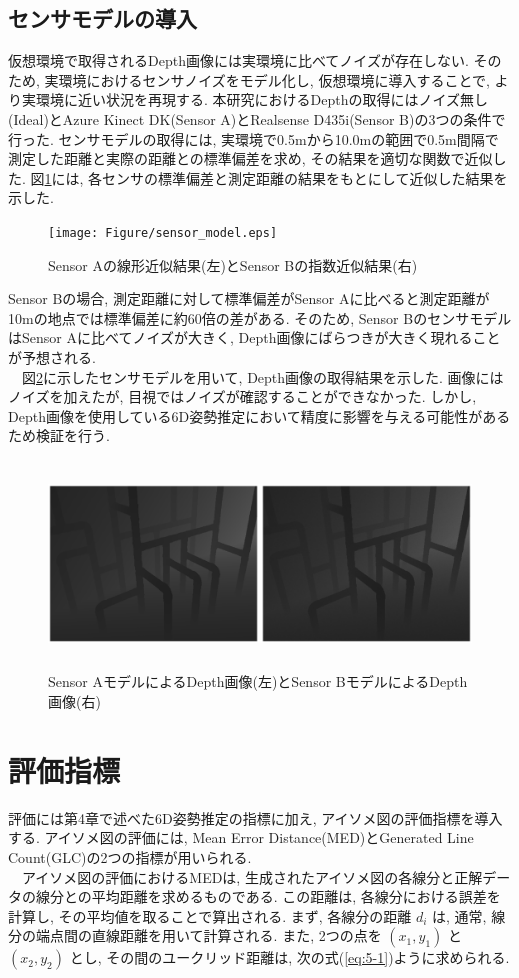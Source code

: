 \subsection{センサモデルの導入}
仮想環境で取得されるDepth画像には実環境に比べてノイズが存在しない. 
そのため, 実環境におけるセンサノイズをモデル化し, 仮想環境に導入することで, より実環境に近い状況を再現する. 
本研究におけるDepthの取得にはノイズ無し(Ideal)とAzure Kinect DK(Sensor A)とRealsense D435i(Sensor B)の3つの条件で行った. 
センサモデルの取得には, 実環境で0.5mから10.0mの範囲で0.5m間隔で測定した距離と実際の距離との標準偏差を求め, その結果を適切な関数で近似した. 
図\ref{fig:5-f2}には, 各センサの標準偏差と測定距離の結果をもとにして近似した結果を示した. 
\begin{figure}[htbt]
    \centering
    \texttt{[image: Figure/sensor\_model.eps]}
    \caption{Sensor Aの線形近似結果(左)とSensor Bの指数近似結果(右)}
    \label{fig:5-f2}
\end{figure}

Sensor Bの場合, 測定距離に対して標準偏差がSensor Aに比べると測定距離が10mの地点では標準偏差に約60倍の差がある. 
そのため, Sensor BのセンサモデルはSensor Aに比べてノイズが大きく, Depth画像にばらつきが大きく現れることが予想される. \\
　図\ref{fig:5-f3}に示したセンサモデルを用いて, Depth画像の取得結果を示した. 
画像にはノイズを加えたが, 目視ではノイズが確認することができなかった.
しかし, Depth画像を使用している6D姿勢推定において精度に影響を与える可能性があるため検証を行う. 
\begin{figure}[htbt]
    \centering
    \includegraphics[height=55mm]{Figure/depth_sim.eps}
    \caption{Sensor AモデルによるDepth画像(左)とSensor BモデルによるDepth画像(右)}
    \label{fig:5-f3}
\end{figure}

\section{評価指標}
評価には第4章で述べた6D姿勢推定の指標に加え, アイソメ図の評価指標を導入する. 
アイソメ図の評価には, Mean Error Distance(MED)とGenerated Line Count(GLC)の2つの指標が用いられる. \\
　アイソメ図の評価におけるMEDは, 生成されたアイソメ図の各線分と正解データの線分との平均距離を求めるものである. 
この距離は, 各線分における誤差を計算し, その平均値を取ることで算出される. 
まず, 各線分の距離 $d_i$ は, 通常, 線分の端点間の直線距離を用いて計算される. 
また, 2つの点を $(x_1, y_1)$ と $(x_2, y_2)$ とし, その間のユークリッド距離は, 次の式(\ref{eq:5-1})ように求められる. 

